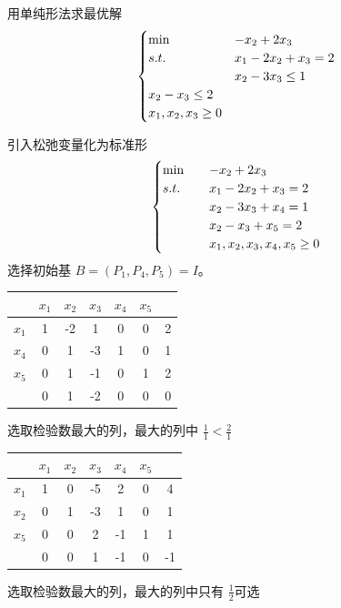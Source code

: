 \begin{example}
    用单纯形法求最优解
    \[
        \begin{cases}
            \min \quad &-x_2 + 2x_3\\
            s.t. \quad &x_1 - 2x_2 + x_3 = 2\\
            &x_2 - 3x_3 \le 1\\
            x_2 - x_3 \le 2\\
            x_1, x_2, x_3 \ge 0
        \end{cases}  
    \]

    \answer 引入松弛变量化为标准形
    \[
        \begin{cases}
            \min \quad &-x_2 + 2x_3\\
            s.t. \quad &x_1 - 2x_2 + x_3 = 2\\
            &x_2 - 3x_3 + x_4 = 1\\
            &x_2 - x_3 + x_5 = 2\\
            &x_1, x_2, x_3, x_4, x_5 \ge 0
        \end{cases}    
    \]
    选择初始基 $B = (P_1, P_4, P_5) = I$。
    \begin{center}
        \begin{tabular}{c|ccccc|c}
            & $x_1$ & $x_2$ & $x_3$ & $x_4$ & $x_5$ & \\
            \hline
            $x_1$ & 1 & -2 & 1 & 0 & 0 & 2\\
            $x_4$ & 0 & {\color{red} 1} & -3 & 1 & 0 & 1\\
            $x_5$ & 0 & 1 & -1 & 0 & 1 & 2\\
            \hline
             & 0 & 1 & -2 & 0 & 0 & 0
        \end{tabular}

        选取检验数最大的列，最大的列中 $\frac{1}{1} < \frac{2}{1}$

        \begin{tabular}{c|ccccc|c}
            & $x_1$ & $x_2$ & $x_3$ & $x_4$ & $x_5$ & \\
            \hline
            $x_1$ & 1 & 0 & -5 & 2 & 0 & 4\\
            $x_2$ & 0 & 1 & -3 & 1 & 0 & 1\\
            $x_5$ & 0 & 0 & {\color{red} 2} & -1 & 1 & 1\\
            \hline
            & 0 & 0 & 1 & -1 & 0 & -1
        \end{tabular}
        
        选取检验数最大的列，最大的列中只有 $\frac{1}{2}$可选


\end{center}
\end{example}
